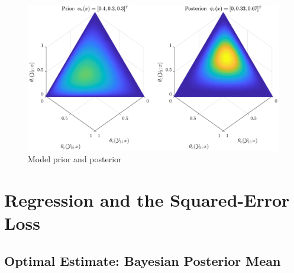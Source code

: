 \documentclass{article}
\DeclareMathOperator{\xrm}{\mathrm{x}}
\DeclareMathOperator{\yrm}{\mathrm{y}}
\DeclareMathOperator{\Drm}{\mathrm{D}}
\DeclareMathOperator{\Prm}{\mathrm{P}}
\begin{document}
\begin{figure}
	\centering
	\includegraphics[width=0.9\linewidth]{P_theta_post_SSP.pdf}
	\caption{Model prior and posterior}
	\label{fig:P_theta_post_tilde}
\end{figure}



%









\section{Regression and the Squared-Error Loss}



\subsection{Optimal Estimate: Bayesian Posterior Mean}
\end{document}
